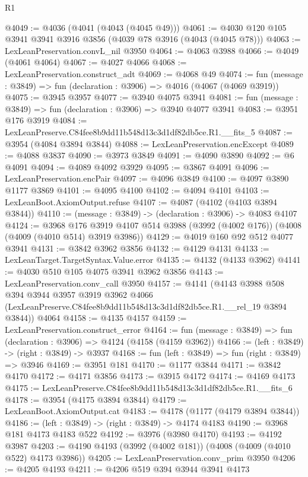 \begin{lexlean}{R1}
\begin{coremodule}
@4049 := @4036 (@4041 (@4043 (@4045 @49)))
@4061 := @4030 @120 @105 @3941 @3941 @3916 @3856 (@4039 @78 @3916 (@4043 (@4045 @78)))
@4063 := LexLeanPreservation.convL_nil @3950
@4064 := @4063 @3988
@4066 := @4049 (@4061 @4064)
@4067 := @4027 @4066
@4068 := LexLeanPreservation.construct_adt
@4069 := @4068 @49
@4074 := fun (message : @3849) => fun (declaration : @3906) => @4016 (@4067 (@4069 @3919))
@4075 := @3945 @3957
@4077 := @3940 @4075 @3941
@4081 := fun (message : @3849) => fun (declaration : @3906) => @3940 @4077 @3941
@4083 := @3951 @176 @3919
@4084 := LexLeanPreserve.C84fee8b9dd11b548d13c3d1df82db5ce.R1.__fits_5
@4087 := @3954 (@4084 @3894 @3844)
@4088 := LexLeanPreservation.encExcept
@4089 := @4088 @3837
@4090 := @3973 @3849
@4091 := @4090 @3890
@4092 := @6 @4091
@4094 := @4089 @4092 @3929
@4095 := @3867 @4091
@4096 := LexLeanPreservation.encPair
@4097 := @4096 @3849
@4100 := @4097 @3890 @1177 @3869
@4101 := @4095 @4100
@4102 := @4094 @4101
@4103 := LexLeanBoot.AxiomOutput.refuse
@4107 := @4087 (@4102 (@4103 @3894 @3844))
@4110 := (message : @3849) -> (declaration : @3906) -> @4083 @4107
@4124 := @3968
    @176
    @3919
    @4107
    @514
    @3988
    (@3992 (@4002 @176))
    (@4008 (@4009 (@4010 @514) @3919 @3986))
@4129 := @4019 @160 @92 @512 @4077 @3941
@4131 := @3842 @3962 @3856
@4132 := @4129 @4131
@4133 := LexLeanTarget.TargetSyntax.Value.error
@4135 := @4132 (@4133 @3962)
@4141 := @4030 @510 @105 @4075 @3941 @3962 @3856
@4143 := LexLeanPreservation.conv_call @3950
@4157 := @4141
    (@4143
      @3988
      @508
      @394
      @3944
      @3957
      @3919
      @3962
      @4066
      (LexLeanPreserve.C84fee8b9dd11b548d13c3d1df82db5ce.R1.__rel_19 @3894 @3844))
    @4064
@4158 := @4135 @4157
@4159 := LexLeanPreservation.construct_error
@4164 := fun (message : @3849) => fun (declaration : @3906) => @4124 (@4158 (@4159 @3962))
@4166 := (left : @3849) -> (right : @3849) -> @3937
@4168 := fun (left : @3849) => fun (right : @3849) => @3946
@4169 := @3951 @181
@4170 := @1177 @3844
@4171 := @3842 @4170
@4172 := @4171 @3856
@4173 := @3915 @4172
@4174 := @4169 @4173
@4175 := LexLeanPreserve.C84fee8b9dd11b548d13c3d1df82db5ce.R1.__fits_6
@4178 := @3954 (@4175 @3894 @3844)
@4179 := LexLeanBoot.AxiomOutput.cat
@4183 := @4178 (@1177 (@4179 @3894 @3844))
@4186 := (left : @3849) -> (right : @3849) -> @4174 @4183
@4190 := @3968 @181 @4173 @4183 @522
@4192 := @3976 (@3980 @4170)
@4193 := @4192 @3987
@4203 := @4190 @4193 (@3992 (@4002 @181)) (@4008 (@4009 (@4010 @522) @4173 @3986))
@4205 := LexLeanPreservation.conv_prim @3950
@4206 := @4205 @4193
@4211 := @4206 @519 @394 @3944 @3941 @4173

\end{coremodule}
\end{lexlean}
